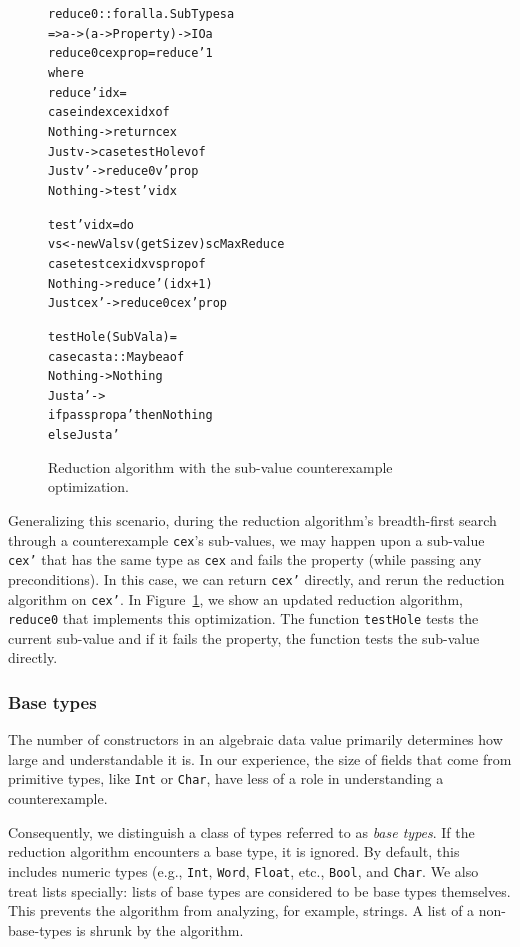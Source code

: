 \documentclass[10pt]{sigplanconf}
\newenvironment{code}{\begin{alltt}}{\end{alltt}}
\newcommand{\ttp}[1]{\texttt{#1}}
\begin{document}
\begin{figure}
\begin{code}
reduce0 :: forall a . SubTypes a
        => a -> (a -> Property) -> IO a
reduce0 cex prop = reduce' 1
  where
  reduce' idx =
    case index cex idx of
      Nothing -> return cex
      Just v  -> case testHole v of
                   Just v' -> reduce0 v' prop
                   Nothing -> test' v idx

  test' v idx = do
    vs <- newVals v (getSize v) scMaxReduce
    case test cex idx vs prop of
      Nothing   -> reduce' (idx+1)
      Just cex' -> reduce0 cex' prop

  testHole (SubVal a) =
    case cast a :: Maybe a of
      Nothing -> Nothing
      Just a' ->
        if pass prop a' then Nothing
          else Just a'
\end{code}
  \caption{Reduction algorithm with the sub-value counterexample optimization.}
  \label{fig:reduce0}
\end{figure}

Generalizing this scenario, during the reduction algorithm's breadth-first
search through a counterexample \ttp{cex}'s sub-values, we may happen upon a
sub-value \ttp{cex'} that has the same type as \ttp{cex} and fails the property
(while passing any preconditions).  In this case, we can return \ttp{cex'}
directly, and rerun the reduction algorithm on \ttp{cex'}.  In
Figure~\ref{fig:reduce0}, we show an updated reduction algorithm, \ttp{reduce0}
that implements this optimization.  The function \ttp{testHole} tests the
current sub-value and if it fails the property, the function tests the sub-value
directly.

\subsubsection{Base types}

The number of constructors in an algebraic data value primarily determines how
large and understandable it is.  In our experience, the size of fields that come
from primitive types, like \ttp{Int} or \ttp{Char}, have less of a role in
understanding a counterexample.

Consequently, we distinguish a class of types referred to as \emph{base types}.
If the reduction algorithm encounters a base type, it is ignored.  By default,
this includes numeric types (e.g., \ttp{Int}, \ttp{Word}, \ttp{Float}, etc.,
\ttp{Bool}, and \ttp{Char}.  We also treat lists specially: lists of base types
are considered to be base types themselves.  This prevents the algorithm from
analyzing, for example, strings.  A list of a non-base-types is shrunk by the
algorithm.
\end{document}
